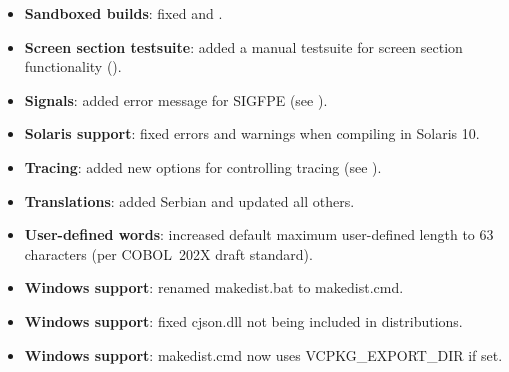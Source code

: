 \begin{itemize}
\item \textbf{Sandboxed builds}: fixed  and .
\item  \textbf{Screen section testsuite}: added a manual testsuite for screen section functionality ().
\item \textbf{Signals}: added error message for SIGFPE (see ).
\item \textbf{Solaris support}: fixed errors and warnings when compiling in Solaris 10.
\item \textbf{Tracing}: added new options for controlling tracing (see ).
\item \textbf{Translations}: added Serbian and updated all others.
\item \textbf{User-defined words}: increased default maximum user-defined length to 63 characters (per COBOL~202X draft standard).
\item \textbf{Windows support}: renamed makedist.bat to makedist.cmd.
\item \textbf{Windows support}: fixed cjson.dll not being included in distributions.
\item \textbf{Windows support}: makedist.cmd now uses VCPKG\_EXPORT\_DIR if set.
\end{itemize}

